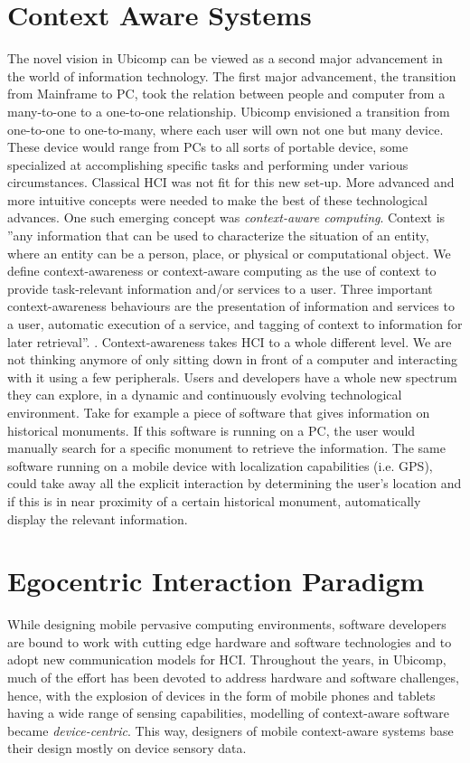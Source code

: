 \section{Context Aware Systems}
The novel vision in Ubicomp can be viewed as a second major advancement in the world of information technology. The first major advancement, the transition from Mainframe to PC, took the relation between people and computer from a many-to-one to a one-to-one relationship. Ubicomp envisioned a transition from one-to-one to one-to-many, where each user will own not one but many device. These device would range from PCs to all sorts of portable device, some specialized at accomplishing specific tasks and performing under various circumstances. Classical HCI was not fit for this new set-up. More advanced and more intuitive concepts were needed to make the best of these technological advances. One such emerging concept was \emph{context-aware computing}. Context is ''any information that can be used to characterize the situation of an entity, where an entity can be a person, place, or physical or computational object. We define context-awareness or context-aware computing as the use of context to provide task-relevant information and/or services to a user. Three important context-awareness behaviours are the presentation of information and services to a user, automatic execution of a service, and tagging of context to information for later retrieval''. \cite{abowd1999towards}. Context-awareness takes HCI to a whole different level. We are not thinking anymore of only sitting down in front of a computer and interacting with it using a few peripherals. Users and developers have a whole new spectrum they can explore, in a dynamic and continuously evolving technological environment. Take for example a piece of software that gives information on historical monuments. If this software is running on a PC, the user would manually search for a specific monument to retrieve the information. The same software running on a mobile device with localization capabilities (i.e. GPS), could take away all the explicit interaction by determining the user's location and if this is in near proximity of a certain historical monument, automatically display the relevant information.\\

\section{Egocentric Interaction Paradigm}
While designing mobile pervasive computing environments, software developers are bound to work with cutting edge hardware and software technologies and to adopt new communication models for HCI. Throughout the years, in Ubicomp, much of the effort has been devoted to address hardware and software challenges, hence, with the explosion of devices in the form of mobile phones and tablets having a wide range of sensing capabilities, modelling of context-aware software became \emph{device-centric}. This way, designers of mobile context-aware systems base their design mostly on device sensory data.\\

